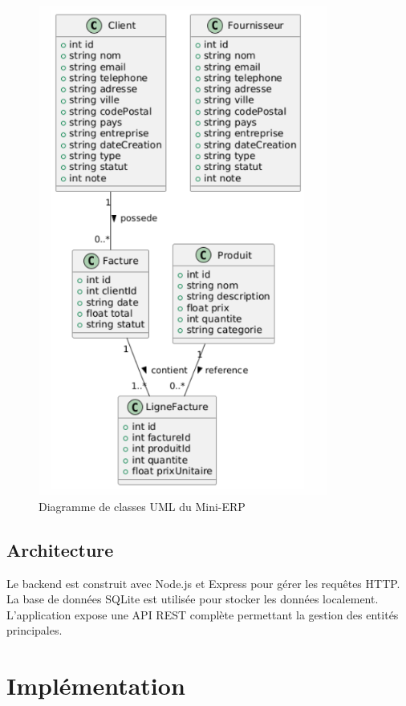 \documentclass[a4paper,12pt]{article}
\begin{document}
\begin{figure}[h!]
  \centering
  \includegraphics[width=0.85\textwidth]{uml.png}
  \caption{Diagramme de classes UML du Mini-ERP}
  \label{fig:uml}
\end{figure}

\subsection{Architecture}

Le backend est construit avec Node.js et Express pour gérer les requêtes HTTP. La base de données SQLite est utilisée pour stocker les données localement. L'application expose une API REST complète permettant la gestion des entités principales.

\section{Implémentation}
\end{document}
